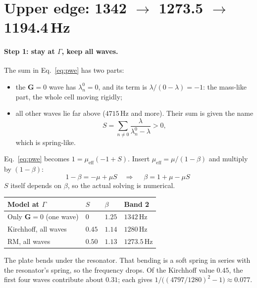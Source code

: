 \section{Upper edge: 1342 $\to$ 1273.5 $\to$ 1194.4\,Hz}

\paragraph{Step 1: stay at $\Gamma$, keep all waves.}
The sum in Eq.~\eqref{eq:pwe} has two parts:
\begin{itemize}
  \item the $\mathbf{G}=0$ wave has $\lambda_n^0 = 0$, and its term is
        $\lambda/(0-\lambda) = -1$: the mass-like part, the whole cell moving
        rigidly;
  \item all other waves lie far above ($4715\,\mathrm{Hz}$ and more). Their sum
        is given the name
        \begin{equation}
          S = \sum_{n \neq 0} \frac{\lambda}{\lambda_n^0 - \lambda} > 0 ,
        \end{equation}
        which is spring-like.
\end{itemize}
Eq.~\eqref{eq:pwe} becomes $1 = \mu_\mathrm{eff}(-1 + S)$. Insert
$\mu_\mathrm{eff} = \mu/(1-\beta)$ and multiply by $(1-\beta)$:
\begin{equation}
  1 - \beta = -\mu + \mu S
  \quad\Longrightarrow\quad
  \boxed{\;\beta = 1 + \mu - \mu S\;}
\end{equation}
$S$ itself depends on $\beta$, so the actual solving is numerical.
\begin{center}
\begin{tabular}{|l|l|l|l|}
\hline
Model at $\Gamma$ & $S$ & $\beta$ & Band 2 \\
\hline
Only $\mathbf{G}=0$ (one wave) & $0$ & $1.25$ & $1342\,\mathrm{Hz}$ \\
Kirchhoff, all waves & $0.45$ & $1.14$ & $1280\,\mathrm{Hz}$ \\
RM, all waves & $0.50$ & $1.13$ & $1273.5\,\mathrm{Hz}$ \\
\hline
\end{tabular}
\end{center}
The plate bends under the resonator. That bending is a soft spring in series with
the resonator's spring, so the frequency drops. Of the Kirchhoff value $0.45$,
the first four waves contribute about $0.31$; each gives
$1/\bigl((4797/1280)^2 - 1\bigr) \approx 0.077$.

